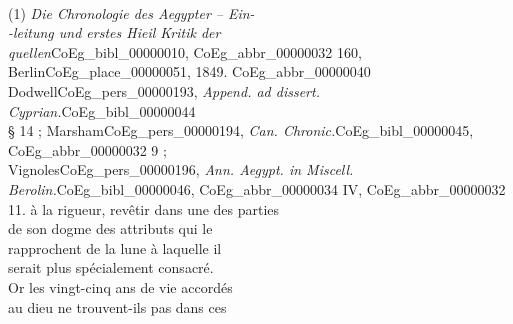 \documentclass{book}
\begin{document}
{\begin{paracol}{2}
\noindent \\
\\
\\
\\
\\
\\
\\
\\
\\
\\
\\
\\
\\
\\
\\
\\
\\
\\
\\
\\
\\
\\
\\
\\
\\
\\
\\
\\
(1) \textit{Die Chronologie des Aegypter – Ein-\\
-leitung und erstes Hieil Kritik der\\
quellen}\gls{CoEg_bibl_00000010}, \gls{CoEg_abbr_00000032} 160, Berlin\gls{CoEg_place_00000051}, 1849. \Gls{CoEg_abbr_00000040}\\
Dodwell\gls{CoEg_pers_00000193}, \textit{Append. ad dissert. Cyprian.}\gls{CoEg_bibl_00000044}\\
§ 14 ; Marsham\gls{CoEg_pers_00000194}, \textit{Can. Chronic.}\gls{CoEg_bibl_00000045}, \gls{CoEg_abbr_00000032} 9 ;\\
Vignoles\gls{CoEg_pers_00000196}, \textit{Ann. Aegypt. in Miscell.\\
Berolin.}\gls{CoEg_bibl_00000046}, \gls{CoEg_abbr_00000034} IV, \gls{CoEg_abbr_00000032} 11.
\switchcolumn
\noindent à la rigueur, revêtir dans une des parties\\
de son dogme des attributs qui le\\
rapprochent de la lune à laquelle il\\
serait plus spécialement consacré.\\
Or les vingt-cinq ans de vie accordés\\
au dieu ne trouvent-ils pas dans ces\\

\end{paracol}}
\end{document}
